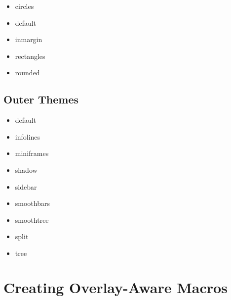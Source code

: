 \ttfamily
\begin{multicols}{4}\raggedcolumns
\begin{itemize}
 \item circles
  \item default
  \item inmargin
  \item rectangles
  \item rounded
\end{itemize}
\end{multicols}
\normalfont

\subsection{Outer Themes}\label{subsec:outer-themes}

\ttfamily
\begin{multicols}{4}\raggedcolumns
\begin{itemize}
  \item default
  \item infolines
  \item miniframes
  \item shadow
  \item sidebar
  \item smoothbars
  \item smoothtree
  \item split
  \item tree
\end{itemize}
\end{multicols}
\normalfont


\section<1-| beamer:0>{Creating Overlay-Aware Macros}\label{sec:overlay-macros}

